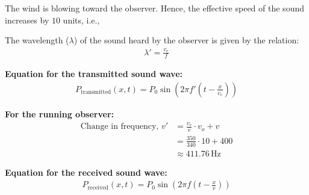 \documentclass[twocolumn]{article}
\begin{document}
The wind is blowing toward the observer. Hence, the effective speed of the sound increases by $10$ units, i.e.,

The wavelength ($\lambda$) of the sound heard by the observer is given by the relation:
\begin{align}
    \lambda' = \frac{v_e}{f}
\end{align}

\textbf{Equation for the transmitted sound wave:}
\begin{align}
    P_{\text{transmitted}}(x, t) = P_0 \sin\left(2\pi f'\left(t - \frac{x}{v_e}\right)\right)
\end{align}

\textbf{For the running observer:}
\begin{align}
    \text{Change in frequency, } v' &= \frac{v_e}{v} \cdot v_o + v \\
    &= \frac{350}{340} \cdot 10 + 400 \\
    &\approx 411.76 \, \text{Hz}
\end{align}

\textbf{Equation for the received sound wave:}
\begin{align}
    P_{\text{received}}(x, t) = P_0 \sin\left(2\pi f\left(t - \frac{x}{v}\right)\right)
\end{align}
\end{document}
